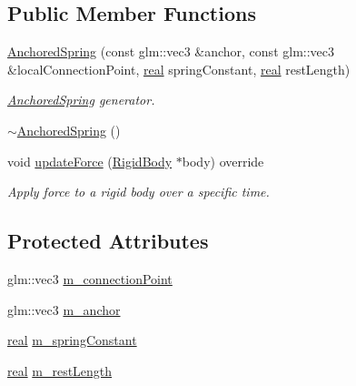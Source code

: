 \subsection*{Public Member Functions}
\begin{DoxyCompactItemize}
\item 
\mbox{\hyperlink{classr3_1_1_anchored_spring_a944423598dfb2e3f080f9f9850c8aa13}{Anchored\+Spring}} (const glm\+::vec3 \&anchor, const glm\+::vec3 \&local\+Connection\+Point, \mbox{\hyperlink{namespacer3_ab2016b3e3f743fb735afce242f0dc1eb}{real}} spring\+Constant, \mbox{\hyperlink{namespacer3_ab2016b3e3f743fb735afce242f0dc1eb}{real}} rest\+Length)
\begin{DoxyCompactList}\small\item\em \mbox{\hyperlink{classr3_1_1_anchored_spring}{Anchored\+Spring}} generator. \end{DoxyCompactList}\item 
\mbox{\hyperlink{classr3_1_1_anchored_spring_afe612722d8ed0d7a6f0058dcc21eb17f}{$\sim$\+Anchored\+Spring}} ()
\item 
void \mbox{\hyperlink{classr3_1_1_anchored_spring_a56aaf13c1f89f2b45b6cb95bf16a2300}{update\+Force}} (\mbox{\hyperlink{classr3_1_1_rigid_body}{Rigid\+Body}} $\ast$body) override
\begin{DoxyCompactList}\small\item\em Apply force to a rigid body over a specific time. \end{DoxyCompactList}\end{DoxyCompactItemize}
\subsection*{Protected Attributes}
\begin{DoxyCompactItemize}
\item 
glm\+::vec3 \mbox{\hyperlink{classr3_1_1_anchored_spring_ac8998ca820fd075aed011136155ec1fb}{m\+\_\+connection\+Point}}
\item 
glm\+::vec3 \mbox{\hyperlink{classr3_1_1_anchored_spring_a1387aec403f6955848fe8c3a28b90a9e}{m\+\_\+anchor}}
\item 
\mbox{\hyperlink{namespacer3_ab2016b3e3f743fb735afce242f0dc1eb}{real}} \mbox{\hyperlink{classr3_1_1_anchored_spring_af17c024b5f8a025f5555946c60b52a67}{m\+\_\+spring\+Constant}}
\item 
\mbox{\hyperlink{namespacer3_ab2016b3e3f743fb735afce242f0dc1eb}{real}} \mbox{\hyperlink{classr3_1_1_anchored_spring_a17441401eb79dd8244a4739a3a574d1a}{m\+\_\+rest\+Length}}
\end{DoxyCompactItemize}
